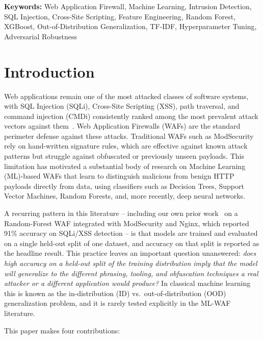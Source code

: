 \documentclass{article}
\begin{document}
\textbf{Keywords:} Web Application Firewall, Machine Learning, Intrusion Detection, SQL Injection, Cross-Site Scripting, Feature Engineering, Random Forest, XGBoost, Out-of-Distribution Generalization, TF-IDF, Hyperparameter Tuning, Adversarial Robustness

\section{Introduction}

Web applications remain one of the most attacked classes of software systems,
with SQL Injection (SQLi), Cross-Site Scripting (XSS), path traversal, and
command injection (CMDi) consistently ranked among the most prevalent attack
vectors against them~\cite{owasp}. Web Application Firewalls (WAFs) are the
standard perimeter defense against these attacks. Traditional WAFs such as
ModSecurity~\cite{modsecurity} rely on hand-written signature rules, which are
effective against known attack patterns but struggle against obfuscated or
previously unseen payloads. This limitation has motivated a substantial body
of research on Machine Learning (ML)-based WAFs that learn to distinguish
malicious from benign HTTP payloads directly from data, using classifiers such
as Decision Trees, Support Vector Machines, Random Forests, and, more
recently, deep neural networks.

A recurring pattern in this literature -- including our own prior
work~\cite{ourprior} on a Random-Forest WAF integrated with ModSecurity and
Nginx, which reported 91\% accuracy on SQLi/XSS detection -- is that models
are trained and evaluated on a single held-out split of one dataset, and
accuracy on that split is reported as the headline result. This practice
leaves an important question unanswered: \emph{does high accuracy on a
held-out split of the training distribution imply that the model will
generalize to the different phrasing, tooling, and obfuscation techniques a
real attacker or a different application would produce?} In classical machine
learning this is known as the in-distribution (ID) vs.\ out-of-distribution
(OOD) generalization problem, and it is rarely tested explicitly in the
ML-WAF literature.

This paper makes four contributions:
\end{document}
